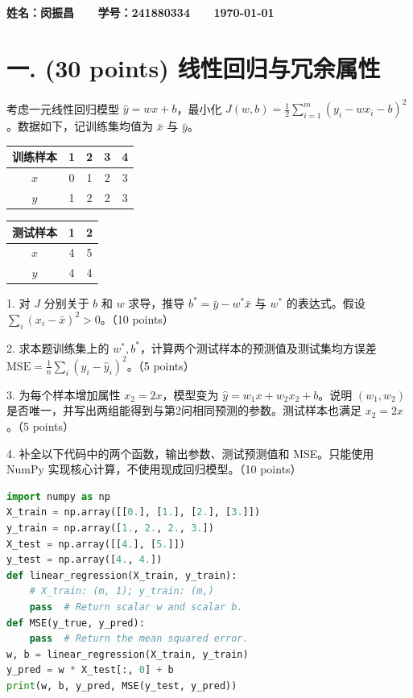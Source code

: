 \documentclass[10pt]{article}
\begin{document}
\textbf{\color{blue} \Large 姓名：闵振昌 \ \ \ 学号：241880334 \ \ \ \today}



\section*{一. (30 points) 线性回归与冗余属性}
考虑一元线性回归模型 $\hat y=wx+b$，最小化 $J(w,b)=\frac12\sum_{i=1}^{m}(y_i-wx_i-b)^2$。数据如下，记训练集均值为 $\bar x$ 与 $\bar y$。
\begin{center}
\begin{tabular}{ccccc}
\toprule
训练样本 & 1 & 2 & 3 & 4 \\
\midrule
$x$ & 0 & 1 & 2 & 3 \\
$y$ & 1 & 2 & 2 & 3 \\
\bottomrule
\end{tabular}
\qquad
\begin{tabular}{ccc}
\toprule
测试样本 & 1 & 2 \\
\midrule
$x$ & 4 & 5 \\
$y$ & 4 & 4 \\
\bottomrule
\end{tabular}
\end{center}
1. 对 $J$ 分别关于 $b$ 和 $w$ 求导，推导 $b^*=\bar y-w^*\bar x$ 与 $w^*$ 的表达式。假设 $\sum_i(x_i-\bar x)^2>0$。（10 points）

2. 求本题训练集上的 $w^*,b^*$，计算两个测试样本的预测值及测试集均方误差 $\mathrm{MSE}=\frac1n\sum_i(y_i-\hat y_i)^2$。（5 points）

3. 为每个样本增加属性 $x_2=2x$，模型变为 $\hat y=w_1x+w_2x_2+b$。说明 $(w_1,w_2)$ 是否唯一，并写出两组能得到与第2问相同预测的参数。测试样本也满足 $x_2=2x$。（5 points）

4. 补全以下代码中的两个函数，输出参数、测试预测值和 MSE。只能使用 NumPy 实现核心计算，不使用现成回归模型。（10 points）
\begin{lstlisting}[language=Python,caption=线性回归代码样例]
import numpy as np
X_train = np.array([[0.], [1.], [2.], [3.]])
y_train = np.array([1., 2., 2., 3.])
X_test = np.array([[4.], [5.]])
y_test = np.array([4., 4.])
def linear_regression(X_train, y_train):
    # X_train: (m, 1); y_train: (m,)
    pass  # Return scalar w and scalar b.
def MSE(y_true, y_pred):
    pass  # Return the mean squared error.
w, b = linear_regression(X_train, y_train)
y_pred = w * X_test[:, 0] + b
print(w, b, y_pred, MSE(y_test, y_pred))
\end{lstlisting}
\end{document}
